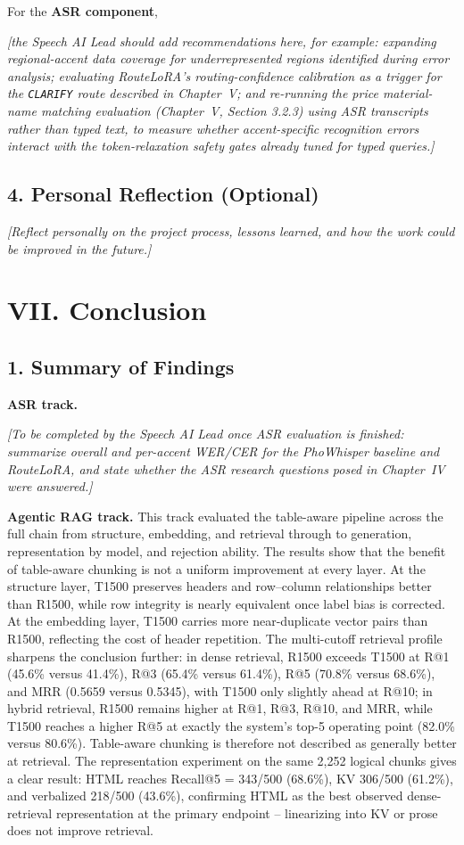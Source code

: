 \documentclass[11pt,a4paper]{article}
\newcommand{\guidance}[1]{%
  {\color{guidanceblue}\itshape [#1]\par}%
}
\newcommand{\chapterstart}[1]{\clearpage\section{#1}}
\begin{document}
For the \textbf{ASR component}, \guidance{the Speech AI Lead should add
recommendations here, for example: expanding regional-accent data coverage
for underrepresented regions identified during error analysis; evaluating
RouteLoRA's routing-confidence calibration as a trigger for the
\texttt{CLARIFY} route described in Chapter~V; and re-running the price
material-name matching evaluation (Chapter~V, Section 3.2.3) using ASR
transcripts rather than typed text, to measure whether accent-specific
recognition errors interact with the token-relaxation safety gates already
tuned for typed queries.}

\subsection{4. Personal Reflection (Optional)}
\guidance{Reflect personally on the project process, lessons learned, and how
the work could be improved in the future.}

\chapterstart{VII. Conclusion}

\subsection{1. Summary of Findings}

\textbf{ASR track.} \guidance{To be completed by the Speech AI Lead once ASR
evaluation is finished: summarize overall and per-accent WER/CER for the
PhoWhisper baseline and RouteLoRA, and state whether the ASR research
questions posed in Chapter~IV were answered.}

\textbf{Agentic RAG track.} This track evaluated the table-aware pipeline
across the full chain from structure, embedding, and retrieval through to
generation, representation by model, and rejection ability. The results
show that the benefit of table-aware chunking is not a uniform improvement
at every layer. At the structure layer, T1500 preserves headers and
row--column relationships better than R1500, while row integrity is nearly
equivalent once label bias is corrected. At the embedding layer, T1500
carries more near-duplicate vector pairs than R1500, reflecting the cost of
header repetition. The multi-cutoff retrieval profile sharpens the
conclusion further: in dense retrieval, R1500 exceeds T1500 at R@1 (45.6\%
versus 41.4\%), R@3 (65.4\% versus 61.4\%), R@5 (70.8\% versus 68.6\%), and
MRR (0.5659 versus 0.5345), with T1500 only slightly ahead at R@10; in
hybrid retrieval, R1500 remains higher at R@1, R@3, R@10, and MRR, while
T1500 reaches a higher R@5 at exactly the system's top-5 operating point
(82.0\% versus 80.6\%). Table-aware chunking is therefore not described as
generally better at retrieval. The representation experiment on the same
2,252 logical chunks gives a clear result: HTML reaches Recall@5 =
343/500 (68.6\%), KV 306/500 (61.2\%), and verbalized 218/500 (43.6\%),
confirming HTML as the best observed dense-retrieval representation at the
primary endpoint -- linearizing into KV or prose does not improve
retrieval.
\end{document}
